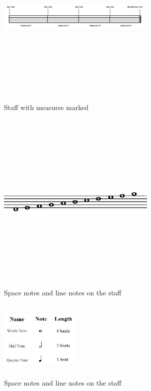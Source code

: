 \documentclass[journal]{IEEEtran}
\begin{document}
\begin{figure}
\includegraphics[width=3in,height=3.5in,clip,keepaspectratio]{resources/images/measure_lines}
\centering
\caption{Staff with measures marked}
\end{figure}


\begin{figure}
\includegraphics[width=3in,height=3.5in,clip,keepaspectratio]{resources/images/notes}
\centering
\caption{Space notes and line notes on the staff}
\end{figure}

\begin{figure}
\includegraphics[width=1.5in,height=1.5in,clip,keepaspectratio]{resources/images/note_types}
\centering
\caption{Space notes and line notes on the staff}
\end{figure}
\end{document}
